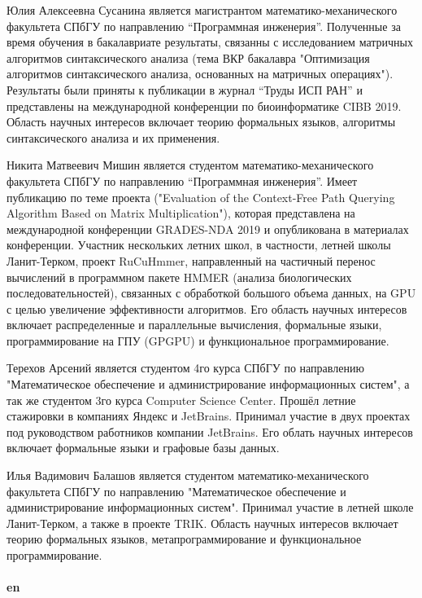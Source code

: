 \documentclass[12pt]{article}  %
\theoremstyle{remark}
\begin{document}
Юлия Алексеевна Сусанина является магистрантом математико-механического факультета СПбГУ по направлению “Программная инженерия”.
Полученные за время обучения в бакалавриате результаты, связанны с исследованием матричных алгоритмов синтаксического анализа (тема ВКР бакалавра "Оптимизация алгоритмов синтаксического
анализа, основанных на матричных
операциях"). Результаты были приняты к публикации в журнал “Труды ИСП РАН” и представлены на международной конференции по биоинформатике CIBB 2019.
Область научных интересов включает теорию формальных языков, алгоритмы синтаксического анализа и их применения.

Никита Матвеевич Мишин является студентом математико-механического факультета СПбГУ  по направлению “Программная инженерия”.
Имеет публикацию по теме проекта ("Evaluation of the Context-Free Path Querying Algorithm Based on Matrix Multiplication"), которая представлена на международной конференции GRADES-NDA 2019 и опубликована в материалах конференции.
Участник нескольких летних школ, в частности, летней школы Ланит-Терком, проект RuCuHmmer,
направленный на частичный перенос вычислений в программном пакете HMMER (анализа биологических последовательностей),
связанных с обработкой большого объема данных, на GPU с целью увеличение эффективности алгоритмов.
Его область научных интересов включает распределенные и параллельные вычисления, формальные языки, программирование на ГПУ (GPGPU) и функциональное программирование.

Терехов Арсений является студентом 4го курса СПбГУ по направлению "Математическое обеспечение и администрирование информационных
систем", а так же студентом 3го курса Computer Science Center. Прошёл летние стажировки в компаниях Яндекс и JetBrains. Принимал участие в двух проектах под руководством работников компании JetBrains.
Его облать научных интересов включает формальные языки и графовые базы данных.

Илья Вадимович Балашов является студентом математико-механического факультета СПбГУ по направлению "Математическое обеспечение и администрирование информационных систем". Принимал участие в летней школе Ланит-Терком, а также в проекте TRIK.
Область научных интересов включает теорию формальных языков, метапрограммирование и функциональное программирование.
\\
\\
\textbf{en}
\end{document}
